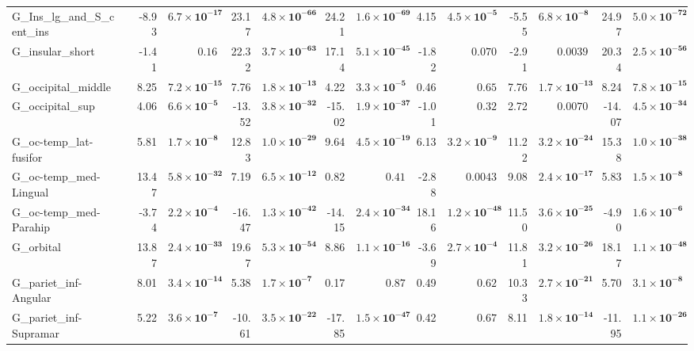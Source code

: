 {\begin{longtable}{llrrrrrrrrrrrr}
G\_Ins\_lg\_and\_S\_cent\_ins &  & -8.93 & $\mathbf{6.7{\times}10^{-17}}$ & 23.17 & $\mathbf{4.8{\times}10^{-66}}$ & 24.21 & $\mathbf{1.6{\times}10^{-69}}$ & 4.15 & $\mathbf{4.5{\times}10^{-5}}$ & -5.55 & $\mathbf{6.8{\times}10^{-8}}$ & 24.97 & $\mathbf{5.0{\times}10^{-72}}$ \\
G\_insular\_short &  & -1.41 & $0.16$ & 22.32 & $\mathbf{3.7{\times}10^{-63}}$ & 17.14 & $\mathbf{5.1{\times}10^{-45}}$ & -1.82 & $0.070$ & -2.91 & $0.0039$ & 20.34 & $\mathbf{2.5{\times}10^{-56}}$ \\
G\_occipital\_middle &  & 8.25 & $\mathbf{7.2{\times}10^{-15}}$ & 7.76 & $\mathbf{1.8{\times}10^{-13}}$ & 4.22 & $\mathbf{3.3{\times}10^{-5}}$ & 0.46 & $0.65$ & 7.76 & $\mathbf{1.7{\times}10^{-13}}$ & 8.24 & $\mathbf{7.8{\times}10^{-15}}$ \\
G\_occipital\_sup &  & 4.06 & $\mathbf{6.6{\times}10^{-5}}$ & -13.52 & $\mathbf{3.8{\times}10^{-32}}$ & -15.02 & $\mathbf{1.9{\times}10^{-37}}$ & -1.01 & $0.32$ & 2.72 & $0.0070$ & -14.07 & $\mathbf{4.5{\times}10^{-34}}$ \\
G\_oc-temp\_lat-fusifor &  & 5.81 & $\mathbf{1.7{\times}10^{-8}}$ & 12.83 & $\mathbf{1.0{\times}10^{-29}}$ & 9.64 & $\mathbf{4.5{\times}10^{-19}}$ & 6.13 & $\mathbf{3.2{\times}10^{-9}}$ & 11.22 & $\mathbf{3.2{\times}10^{-24}}$ & 15.38 & $\mathbf{1.0{\times}10^{-38}}$ \\
G\_oc-temp\_med-Lingual &  & 13.47 & $\mathbf{5.8{\times}10^{-32}}$ & 7.19 & $\mathbf{6.5{\times}10^{-12}}$ & 0.82 & $0.41$ & -2.88 & $0.0043$ & 9.08 & $\mathbf{2.4{\times}10^{-17}}$ & 5.83 & $\mathbf{1.5{\times}10^{-8}}$ \\
G\_oc-temp\_med-Parahip &  & -3.74 & $\mathbf{2.2{\times}10^{-4}}$ & -16.47 & $\mathbf{1.3{\times}10^{-42}}$ & -14.15 & $\mathbf{2.4{\times}10^{-34}}$ & 18.16 & $\mathbf{1.2{\times}10^{-48}}$ & 11.50 & $\mathbf{3.6{\times}10^{-25}}$ & -4.90 & $\mathbf{1.6{\times}10^{-6}}$ \\
G\_orbital &  & 13.87 & $\mathbf{2.4{\times}10^{-33}}$ & 19.67 & $\mathbf{5.3{\times}10^{-54}}$ & 8.86 & $\mathbf{1.1{\times}10^{-16}}$ & -3.69 & $\mathbf{2.7{\times}10^{-4}}$ & 11.81 & $\mathbf{3.2{\times}10^{-26}}$ & 18.17 & $\mathbf{1.1{\times}10^{-48}}$ \\
G\_pariet\_inf-Angular &  & 8.01 & $\mathbf{3.4{\times}10^{-14}}$ & 5.38 & $\mathbf{1.7{\times}10^{-7}}$ & 0.17 & $0.87$ & 0.49 & $0.62$ & 10.33 & $\mathbf{2.7{\times}10^{-21}}$ & 5.70 & $\mathbf{3.1{\times}10^{-8}}$ \\
G\_pariet\_inf-Supramar &  & 5.22 & $\mathbf{3.6{\times}10^{-7}}$ & -10.61 & $\mathbf{3.5{\times}10^{-22}}$ & -17.85 & $\mathbf{1.5{\times}10^{-47}}$ & 0.42 & $0.67$ & 8.11 & $\mathbf{1.8{\times}10^{-14}}$ & -11.95 & $\mathbf{1.1{\times}10^{-26}}$ \\

\end{longtable}}
